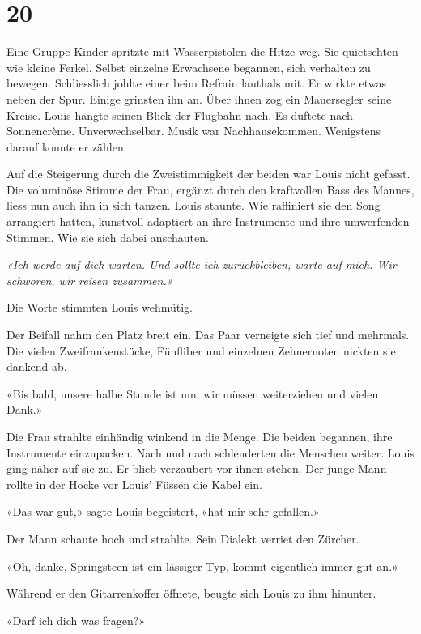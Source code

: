 \chapter{20}

Eine Gruppe Kinder spritzte mit Wasserpistolen die Hitze weg. Sie quietschten wie kleine Ferkel. Selbst einzelne Erwachsene begannen, sich verhalten zu bewegen. 
Schliesslich johlte einer beim Refrain lauthals mit. Er wirkte etwas neben der Spur. Einige
grinsten ihn an. Über ihnen zog ein Mauersegler seine Kreise. Louis hängte seinen
Blick der Flugbahn nach. Es duftete nach Sonnencrème. Unverwechselbar. Musik war Nachhausekommen. 
Wenigstens darauf konnte er zählen. 

Auf die Steigerung durch die Zweistimmigkeit der beiden war Louis nicht
gefasst. Die voluminöse Stimme der Frau, ergänzt durch den kraftvollen
Bass des Mannes, liess nun auch ihn in sich tanzen. Louis staunte. Wie
raffiniert sie den Song arrangiert hatten, kunstvoll adaptiert an ihre Instrumente
und ihre umwerfenden Stimmen. Wie sie sich dabei anschauten.

\sectionbreak 

\emph{«Ich werde auf dich warten. Und sollte ich zurückbleiben, warte auf 
mich. Wir schworen, wir reisen zusammen.»} 

\sectionbreak  

Die Worte stimmten Louis wehmütig.

Der Beifall nahm den Platz breit ein. Das Paar
verneigte sich tief und mehrmals. Die vielen Zweifrankenstücke,
Fünfliber und einzelnen Zehnernoten nickten sie dankend ab.

«Bis bald, unsere halbe Stunde ist um, wir müssen weiterziehen und
vielen Dank.»

Die Frau strahlte einhändig winkend in die Menge. Die beiden begannen,
ihre Instrumente einzupacken. Nach und nach schlenderten die Menschen
weiter. 
Louis ging näher auf sie zu. Er blieb verzaubert vor ihnen stehen.
Der junge Mann rollte in der Hocke vor Louis’ Füssen die Kabel ein.

«Das war gut,» sagte Louis begeistert, «hat mir sehr gefallen.»

Der Mann schaute hoch und strahlte. Sein Dialekt verriet den
Zürcher.

«Oh, danke, Springsteen ist ein lässiger Typ, kommt eigentlich immer gut
an.»

Während er den Gitarrenkoffer öffnete, beugte sich Louis zu ihm hinunter.

«Darf ich dich was fragen?»

